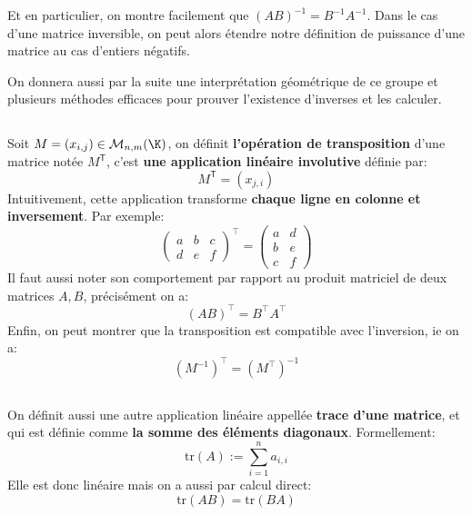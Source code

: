 Et en particulier, on montre facilement que \((AB)^{-1} = B^{-1}A^{-1}\). Dans le cas d'une matrice inversible, on peut alors étendre notre définition de puissance d'une matrice au cas d'entiers négatifs.\<

On donnera aussi par la suite une interprétation géométrique de ce groupe et plusieurs méthodes efficaces pour prouver l'existence d'inverses et les calculer.
\subsection*{}

Soit \(M = (x_{i,j})\in \mathcal{M}_{n, m}(\K)\), on définit \textbf{l'opération de transposition} d'une matrice notée \(M^\mathsf{T}\), c'est \textbf{une application linéaire involutive} définie par:
\[ 
   M^\mathsf{T} = (x_{j,i})
\]
Intuitivement, cette application transforme \textbf{chaque ligne en colonne et inversement}. Par exemple:
\[
   \begin{pmatrix}
      a & b & c\\
      d & e & f
   \end{pmatrix}^\top = 
   \begin{pmatrix}
      a & d\\
      b & e\\
      c & f
   \end{pmatrix}
\]
Il faut aussi noter son comportement par rapport au produit matriciel de deux matrices \(A, B\), précisément on a:
\[ 
   (AB)^\top = B^\top A^\top
\]
Enfin, on peut montrer que la transposition est compatible avec l'inversion, ie on a:
\[ 
   (M^{-1})^{\top} = (M^{\top})^{-1} 
\] 
\subsection*{}

On définit aussi une autre application linéaire appellée \textbf{trace d'une matrice}, et qui est définie comme \textbf{la somme des éléments diagonaux}. Formellement:
\[
   \text{tr}(A) := \sum_{i=1}^{n} a_{i, i}   
\]
Elle est donc linéaire mais on a aussi par calcul direct:
\[ 
   \text{tr}(AB) = \text{tr}(BA)  
\]

